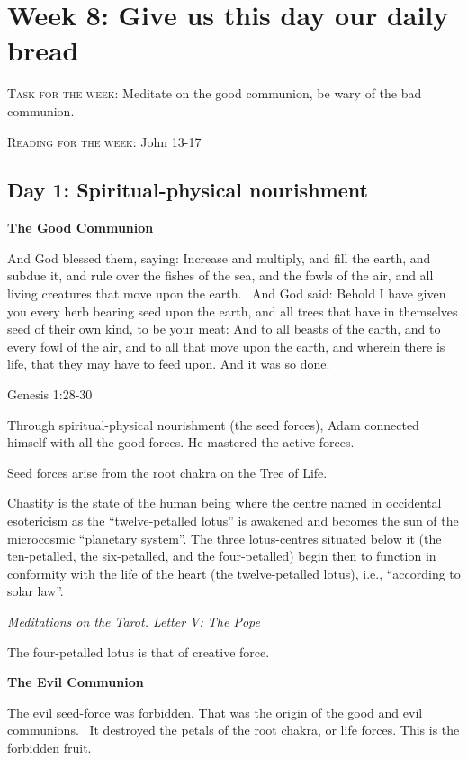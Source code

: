 \section{Week 8: Give us this day our daily bread} 

\textsc{Task for the week}: Meditate on the good communion, be wary of the bad communion.

\textsc{Reading for the week}: John 13-17

\subsection*{Day 1: Spiritual-physical nourishment}
\textbf{The Good Communion}

And God blessed them, saying: Increase and multiply, and fill the earth, and subdue it, and rule over the fishes of the
sea, and the fowls of the air, and all living creatures that move upon the earth.  And God said: Behold I have given
you every herb bearing seed upon the earth, and all trees that have in themselves seed of their own kind, to be your
meat: And to all beasts of the earth, and to every fowl of the air, and to all that move upon the earth, and wherein
there is life, that they may have to feed upon. And it was so done. 

Genesis 1:28-30

Through spiritual-physical nourishment (the seed forces), Adam connected himself with all the good forces. He mastered
the active forces.

Seed forces arise from the root chakra on the Tree of Life.

\begin{quotationx}
Chastity is the state of the human being where the centre named in occidental esotericism as the “twelve-petalled lotus”
is awakened and becomes the sun of the microcosmic “planetary system”. The three lotus-centres situated below it (the
ten-petalled, the six-petalled, and the four-petalled) begin then to function in conformity with the life of the heart
(the twelve-petalled lotus), i.e., “according to solar law”. \begin{flushright} \emph{Meditations on the Tarot. Letter V: The Pope}\end{flushright}

\end{quotationx}
The four-petalled lotus is that of creative force.

\textbf{The Evil Communion}

The evil seed-force was forbidden. That was the origin of the good and evil communions.  It destroyed the petals of the
root chakra, or life forces. This is the forbidden fruit.

